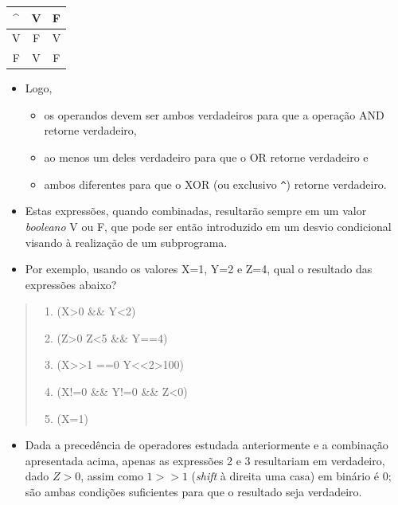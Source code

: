 \documentclass[12pt,a4paper]{article}
\providecommand{\tightlist}{%
      \setlength{\itemsep}{0pt}\setlength{\parskip}{0pt}}
\begin{document}
    \begin{longtable}[]{@{}ccc@{}}
\toprule
\^{} & V & F\tabularnewline
\midrule
\endhead
V & F & V\tabularnewline
F & V & F\tabularnewline
\bottomrule
\end{longtable}

    \begin{itemize}
\tightlist
\item
  Logo,

  \begin{itemize}
  \tightlist
  \item
    os operandos devem ser ambos verdadeiros para que a operação AND
    retorne verdadeiro,
  \item
    ao menos um deles verdadeiro para que o OR retorne verdadeiro e
  \item
    ambos diferentes para que o XOR (ou exclusivo \texttt{\^{}}) retorne
    verdadeiro.
  \end{itemize}
\end{itemize}

    \begin{itemize}
\item
  Estas expressões, quando combinadas, resultarão sempre em um valor
  \emph{booleano} V ou F, que pode ser então introduzido em um desvio
  condicional visando à realização de um subprograma.
\item
  Por exemplo, usando os valores X=1, Y=2 e Z=4, qual o resultado das
  expressões abaixo?
\end{itemize}

\begin{quote}
\begin{enumerate}
\def\labelenumi{\arabic{enumi}.}
\tightlist
\item
  (X\textgreater0 \&\& Y\textless2)
\item
  (Z\textgreater0 \textbar\textbar{} Z\textless5 \&\& Y==4)
\item
  (X\textgreater\textgreater1 ==0 \textbar\textbar{}
  Y\textless\textless2\textgreater100)
\item
  (X!=0 \&\& Y!=0 \&\& Z\textless0)
\item
  (X=1)
\end{enumerate}
\end{quote}

    \begin{itemize}
\tightlist
\item
  Dada a precedência de operadores estudada anteriormente e a combinação
  apresentada acima, apenas as expressões 2 e 3 resultariam em
  verdadeiro, dado \(Z>0\), assim como \(1>>1\) (\emph{shift} à direita
  uma casa) em binário é 0; são ambas condições suficientes para que o
  resultado seja verdadeiro.
\end{itemize}
\end{document}
